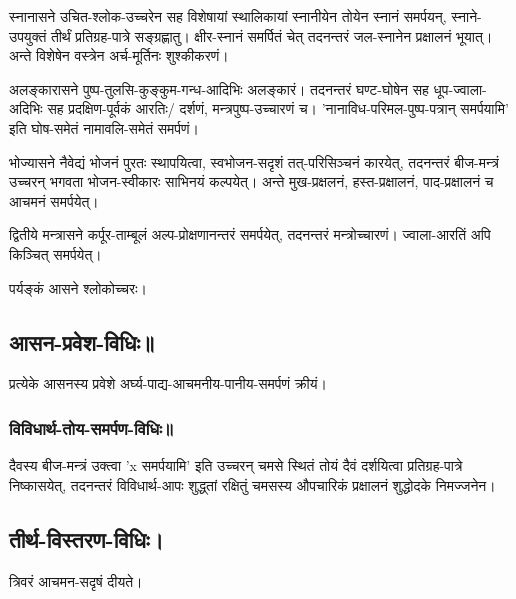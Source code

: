 \documentclass[oneside, article]{memoir}
\begin{document}
स्नानासने उचित-श्लोक-उच्चरेन सह विशेषायां स्थालिकायां स्नानीयेन तोयेन स्नानं समर्पयन्, स्नाने-उपयुक्तं तीर्थं प्रतिग्रह-पात्रे सङ्ग्रह्णातु। क्षीर-स्नानं समर्पितं चेत् तदनन्तरं जल-स्नानेन प्रक्षालनं भूयात्। अन्ते विशेषेन वस्त्रेन अर्च-मूर्तिनः शुश्कीकरणं।

अलङ्कारासने पुष्प-तुलसि-कुङ्कुम-गन्ध-आदिभिः अलङ्कारं। तदनन्तरं घण्ट-घोषेन सह धूप-ज्वाला-अदिभिः सह प्रदक्षिण-पूर्वकं आरतिः/ दर्शणं, मन्त्रपुष्प-उच्चारणं च। 'नानाविध-परिमल-पुष्प-पत्रान् समर्पयामि' इति घोष-समेतं नामावलि-समेतं समर्पणं। 

भोज्यासने नैवेद्यं भोजनं पुरतः स्थापयित्वा, स्वभोजन-सदृशं तत्-परिसिञ्चनं कारयेत्, तदनन्तरं बीज-मन्त्रं उच्चरन् भगवता भोजन-स्वीकारः साभिनयं कल्पयेत्। अन्ते मुख-प्रक्षलनं, हस्त-प्रक्षालनं, पाद-प्रक्षालनं च आचमनं समर्पयेत्।

द्वितीये मन्त्रासने कर्पूर-ताम्बूलं अल्प-प्रोक्षणानन्तरं समर्पयेत्, तदनन्तरं मन्त्रोच्चारणं। ज्वाला-आरतिं अपि किञ्चित् समर्पयेत्।

पर्यङ्कं आसने श्लोकोच्चरः।

\subsection{आसन-प्रवेश-विधिः॥}
प्रत्येके आसनस्य प्रवेशे अर्घ्य-पाद्य-आचमनीय-पानीय-समर्पणं क्रीयं।

\subsubsection{विविधार्थ-तोय-समर्पण-विधिः॥}
दैवस्य बीज-मन्त्रं उक्त्वा 'x समर्पयामि' इति उच्चरन् चमसे स्थितं‌ तोयं दैवं दर्शयित्वा प्रतिग्रह-पात्रे निष्कासयेत्, तदनन्तरं विविधार्थ-आपः शुद्ध्तां रक्षितुं चमसस्य औपचारिकं प्रक्षालनं शुद्धोदके निमज्जनेन।

\subsection{तीर्थ-विस्तरण-विधिः।}
त्रिवरं आचमन-सदृषं दीयते। 
\end{document}
